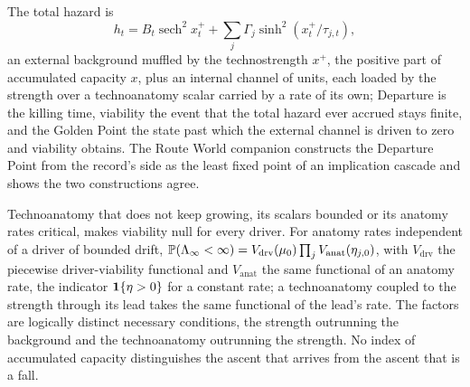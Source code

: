 \begin{definition}\label{imp:model}
The total hazard is
\[
h_t=B_t\operatorname{sech}^2x_t^++\sum_j\Gamma_j\sinh^2(x_t^+/\tau_{j,t}),
\]
an external background muffled by the technostrength $x^+$, the positive
part of accumulated capacity $x$, plus an internal channel of units, each
loaded by the strength over a technoanatomy scalar carried by a rate of
its own;
Departure is the killing time, viability the event that the total
hazard ever accrued stays finite, and the Golden Point the state past
which the external channel is driven to zero and viability obtains. The
Route World companion constructs the Departure Point from the record's
side as the least fixed point of an implication cascade and shows the
two constructions agree.
\end{definition}

\begin{theorem}
\label{imp:twocond}
Technoanatomy that does not keep growing, its scalars bounded or its
anatomy rates critical, makes viability null for every driver. For
anatomy rates independent of a driver of bounded drift,
$\mathbb{P}(\Lambda_\infty<\infty)=V_{\mathrm{drv}}(\mu_0)\prod_jV_{\mathrm{anat}}(\eta_{j,0})$,
with $V_{\mathrm{drv}}$ the piecewise driver-viability functional and
$V_{\mathrm{anat}}$ the same functional of an anatomy rate, the indicator
$\mathbf{1}\{\eta>0\}$ for a constant rate; a technoanatomy coupled to the
strength through its lead takes the same functional of the lead's rate.
The factors are logically distinct necessary conditions, the strength
outrunning the background and the technoanatomy outrunning the strength.
No index of accumulated capacity distinguishes the ascent that arrives
from the ascent that is a fall.
\end{theorem}

